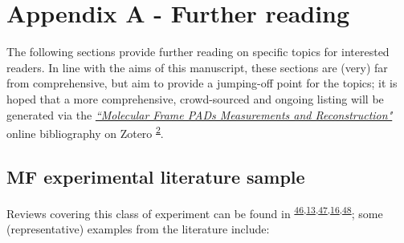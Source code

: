 \documentclass[10pt]{article}
\begin{document}

\section{Appendix A - Further reading\label{sec:Appendix-A}}

The following sections provide further reading on specific topics for interested readers. In line with the aims of this manuscript, these sections are (very) far from comprehensive, but aim to provide a jumping-off point for the topics; it is hoped that a more comprehensive, crowd-sourced and ongoing listing will be generated via the \href{https://www.zotero.org/groups/4733878/molecular_frame_pads_measurements_and_reconstruction}{\textit{``Molecular Frame PADs Measurements and Reconstruction"}} online bibliography on Zotero \textsuperscript{\hyperref[csl:2]{2}}.

\subsection{MF experimental literature sample\label{appendix:MF-expt}}

Reviews covering this class of experiment can be found in  \textsuperscript{\hyperref[csl:46]{46},\hyperref[csl:13]{13},\hyperref[csl:47]{47},\hyperref[csl:16]{16},\hyperref[csl:48]{48}}; some (representative) examples from the literature include:
\end{document}
